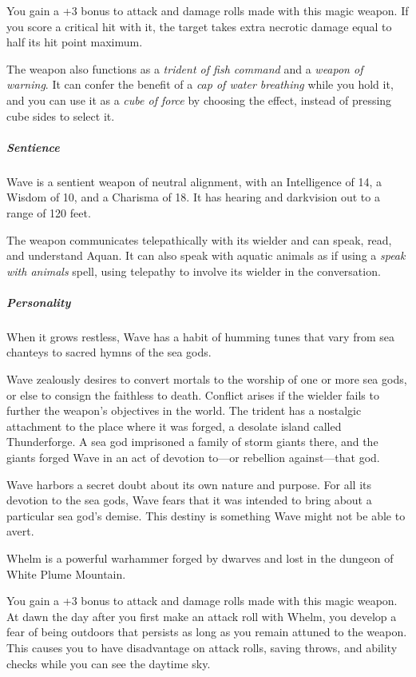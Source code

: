 \documentclass[10pt,a4paper,twoside,bg=print,twocolumn,openany,nodeprecatedcode]{dndbook}
\begin{document}
You gain a +3 bonus to attack and damage rolls made with this magic weapon. If you score a critical hit with it, the target takes extra necrotic damage equal to half its hit point maximum.

The weapon also functions as a \textit{trident of fish command} and a \textit{weapon of warning}. It can confer the benefit of a \textit{cap of water breathing} while you hold it, and you can use it as a \textit{cube of force} by choosing the effect, instead of pressing cube sides to select it.

\subparagraph{Sentience}
Wave is a sentient weapon of neutral alignment, with an Intelligence of 14, a Wisdom of 10, and a Charisma of 18. It has hearing and darkvision out to a range of 120 feet.

The weapon communicates telepathically with its wielder and can speak, read, and understand Aquan. It can also speak with aquatic animals as if using a \textit{speak with animals} spell, using telepathy to involve its wielder in the conversation.

\subparagraph{Personality}
When it grows restless, Wave has a habit of humming tunes that vary from sea chanteys to sacred hymns of the sea gods.

Wave zealously desires to convert mortals to the worship of one or more sea gods, or else to consign the faithless to death. Conflict arises if the wielder fails to further the weapon's objectives in the world. The trident has a nostalgic attachment to the place where it was forged, a desolate island called Thunderforge. A sea god imprisoned a family of storm giants there, and the giants forged Wave in an act of devotion to—or rebellion against—that god.

Wave harbors a secret doubt about its own nature and purpose. For all its devotion to the sea gods, Wave fears that it was intended to bring about a particular sea god's demise. This destiny is something Wave might not be able to avert.

Whelm is a powerful warhammer forged by dwarves and lost in the dungeon of White Plume Mountain.

You gain a +3 bonus to attack and damage rolls made with this magic weapon. At dawn the day after you first make an attack roll with Whelm, you develop a fear of being outdoors that persists as long as you remain attuned to the weapon. This causes you to have disadvantage on attack rolls, saving throws, and ability checks while you can see the daytime sky.
\end{document}
